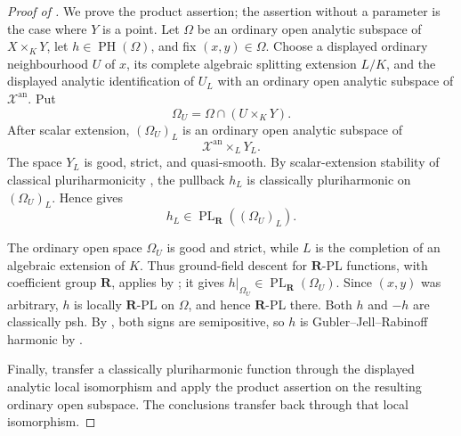 
\begin{proof}[Proof of
]
We prove the product assertion; the assertion without a parameter is the
case where \(Y\) is a point.  Let \(\Omega\) be an ordinary open analytic
subspace of \(X\times_KY\), let \(h\in\operatorname{PH}(\Omega)\), and fix
\((x,y)\in\Omega\).  Choose a displayed ordinary neighbourhood \(U\) of
\(x\), its complete algebraic splitting extension \(L/K\), and the
displayed analytic identification of \(U_L\) with an ordinary open analytic
subspace of \(\mathcal X^{\mathrm{an}}\).  Put
\[
 \Omega_U=\Omega\cap(U\times_KY).
\]
After scalar extension, \((\Omega_U)_L\) is an ordinary open analytic
subspace of
\[
 \mathcal X^{\mathrm{an}}\times_LY_L.
\]
The space \(Y_L\) is good, strict, and quasi-smooth.  By scalar-extension
stability of classical pluriharmonicity
\cite[Proposition~7.2(6)]{GR25Classical}, the pullback \(h_L\) is
classically pluriharmonic on \((\Omega_U)_L\).  Hence
 gives
\[
 h_L\in\operatorname{PL}_{\mathbf R}((\Omega_U)_L).
\]

The ordinary open space \(\Omega_U\) is good and strict, while \(L\) is
the completion of an algebraic extension of \(K\).  Thus ground-field
descent for \(\mathbf R\)-PL functions, with coefficient group
\(\mathbf R\), applies by \cite[Corollary~5.12]{GJR26}; it gives
\(h|_{\Omega_U}\in\operatorname{PL}_{\mathbf R}(\Omega_U)\).  Since
\((x,y)\) was arbitrary, \(h\) is locally \(\mathbf R\)-PL on \(\Omega\),
and hence \(\mathbf R\)-PL there.  Both \(h\) and \(-h\) are classically
psh.  By \cite[Theorem~4.3]{GR25Classical}, both signs are semipositive, so
\(h\) is Gubler--Jell--Rabinoff harmonic by \cite[Definition~7.2]{GJR26}.

Finally, transfer a classically pluriharmonic function through the displayed
analytic local isomorphism and apply the product assertion on the resulting
ordinary open subspace.  The conclusions transfer back through that local
isomorphism.
\end{proof}
